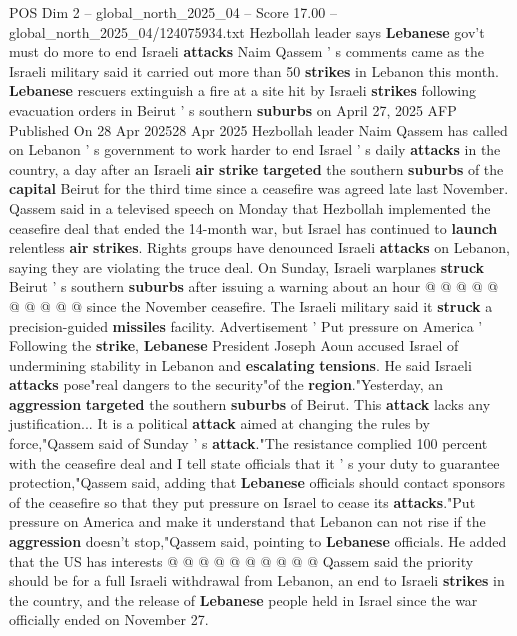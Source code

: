 \begin{textsample}{POS Dim 2 – global\_north\_2025\_04 – Score 17.00 – global\_north\_2025\_04/124075934.txt}  \label{ex:f2_pos_424}
Hezbollah leader says \textbf{Lebanese} gov't must do more to end Israeli \textbf{attacks} Naim Qassem ' s comments came as the Israeli military said it carried out more than 50 \textbf{strikes} in Lebanon this month. \textbf{Lebanese} rescuers extinguish a fire at a site hit by Israeli \textbf{strikes} following evacuation orders in Beirut ' s southern \textbf{suburbs} on April 27, 2025 AFP Published On 28 Apr 202528 Apr 2025 Hezbollah leader Naim Qassem has called on Lebanon ' s government to work harder to end Israel ' s daily \textbf{attacks} in the country, a day after an Israeli \textbf{air} \textbf{strike} \textbf{targeted} the southern \textbf{suburbs} of the \textbf{capital} Beirut for the third time since a ceasefire was agreed late last November.
Qassem said in a televised speech on Monday that Hezbollah implemented the ceasefire deal that ended the 14-month war, but Israel has continued to \textbf{launch} relentless \textbf{air} \textbf{strikes}.
Rights groups have denounced Israeli \textbf{attacks} on Lebanon, saying they are violating the truce deal.
On Sunday, Israeli warplanes \textbf{struck} Beirut ' s southern \textbf{suburbs} after issuing a warning about an hour @ @ @ @ @ @ @ @ @ @ since the November ceasefire.
The Israeli military said it \textbf{struck} a precision-guided \textbf{missiles} facility.
Advertisement ' Put pressure on America ' Following the \textbf{strike}, \textbf{Lebanese} President Joseph Aoun accused Israel of undermining stability in Lebanon and \textbf{escalating} \textbf{tensions}.
He said Israeli \textbf{attacks} pose"real dangers to the security"of the \textbf{region}."Yesterday, an \textbf{aggression} \textbf{targeted} the southern \textbf{suburbs} of Beirut.
This \textbf{attack} lacks any justification...
It is a political \textbf{attack} aimed at changing the rules by force,"Qassem said of Sunday ' s \textbf{attack}."The resistance complied 100 percent with the ceasefire deal and I tell state officials that it ' s your duty to guarantee protection,"Qassem said, adding that \textbf{Lebanese} officials should contact sponsors of the ceasefire so that they put pressure on Israel to cease its \textbf{attacks}."Put pressure on America and make it understand that Lebanon can not rise if the \textbf{aggression} doesn't stop,"Qassem said, pointing to \textbf{Lebanese} officials.
He added that the US has interests @ @ @ @ @ @ @ @ @ @ Qassem said the priority should be for a full Israeli withdrawal from Lebanon, an end to Israeli \textbf{strikes} in the country, and the release of \textbf{Lebanese} people held in Israel since the war officially ended on November 27.

\end{textsample}
